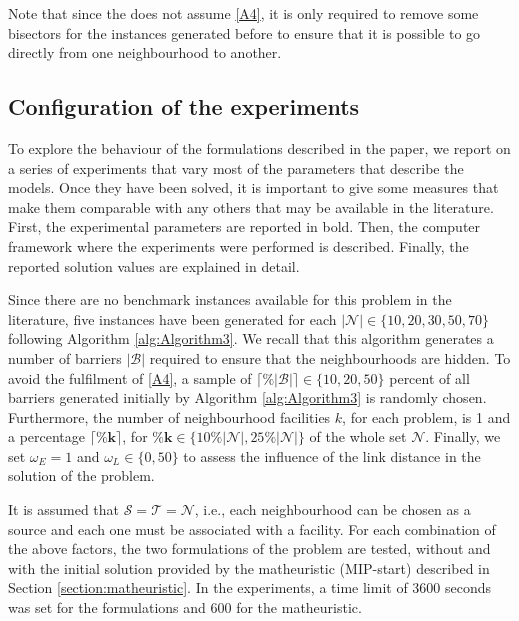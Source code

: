 \documentclass[a4paper,  review, authoryear, 1p.]{elsarticle}
\newcommand{\KMPN}{{\sf{H-KMPN}\xspace }}
\newcommand{\JP}[1]{{\color{blue}#1}}
\newcommand{\CV}[1]{{\color{blue}#1}}
\begin{document}
		
		Note that since the \KMPN \xspace does not assume \ref{A4}, it is only required to remove some bisectors for the instances generated before to ensure that it is possible to go directly from one neighbourhood to another.
		

		\subsection{Configuration of the experiments}
		To explore the behaviour of the formulations described in the paper, we report on a series of experiments that vary most of the parameters that describe the models. Once they have been solved, it is important to give some measures that make them comparable with any others that may be available in the literature. First, the experimental parameters are reported \CV{in bold}. Then, the computer framework where the experiments were performed is described. Finally, the reported solution values are explained in detail. 
		
		Since there are no benchmark instances available for this problem in the literature, five instances have been generated for each $\bm{|\mathcal N|}\in\{10, 20, 30, 50, 70\}$ following Algorithm \ref{alg:Algorithm3}. \CV{We recall that this algorithm generates a number of barriers $|\mathcal B|$ required to ensure that the neighbourhoods are hidden. } \JP{To avoid the fulfilment of \ref{A4}, a sample of $\bm{\lceil \% |\mathcal B| \rceil } \in\{10, 20, 50\}$ percent of all barriers generated initially by Algorithm \ref{alg:Algorithm3} is randomly chosen}.  Furthermore, the number of neighbourhood facilities $k$, for each problem, is 1 and a percentage $\bm{\lceil \% k \rceil}$, for $\bm{\% k}\in\{10 \% |\mathcal N|, 25\% |\mathcal N|\}$ of the whole set $\mathcal N$.  Finally, we set \CV{$\omega_E=1$ and $\omega_L\in\{0,50\}$ to assess the influence of the link distance in the solution of the problem}.
		
		\CV{It is assumed that $\mathcal S=\mathcal T=\mathcal N$, i.e., each neighbourhood can be chosen as a source and each one must be associated with a facility.}
		For each combination of the above factors,  \JP{the two formulations of the problem are tested, without and with the initial solution provided by the matheuristic (MIP-start) described in Section \ref{section:matheuristic}. In the experiments, a time limit of 3600 seconds was set for the formulations and 600 for the matheuristic.}
		
\end{document}
